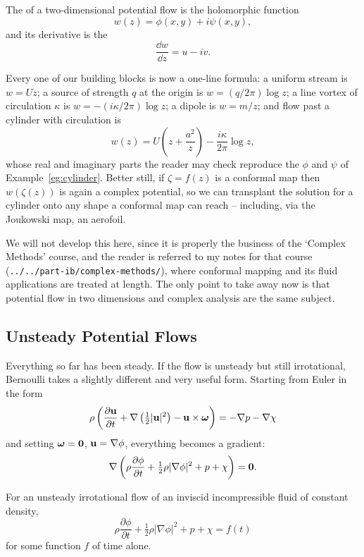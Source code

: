 \documentclass[a4paper]{scrartcl}
\newcommand{\pd}[2]{\frac{\partial #1}{\partial #2}}
\newcommand{\bom}{\boldsymbol{\omega}}
\begin{document}
\begin{definition}
	The  of a two-dimensional potential flow is the holomorphic function
	$$
	w(z) = \phi(x,y) + i \psi(x, y),
	$$
	and its derivative is the 
	$$
	\frac{\dd w}{\dd z} = u - iv.
	$$
\end{definition}

Every one of our building blocks is now a one-line formula: a uniform stream is $w = Uz$; a source of strength $q$ at the origin is $w = (q/2\pi)\log z$; a line vortex of circulation $\kappa$ is $w = -(i\kappa/2\pi)\log z$; a dipole is $w = m/z$; and flow past a cylinder with circulation is
$$
w(z) = U\left(z + \frac{a^2}{z}\right) - \frac{i\kappa}{2\pi}\log z,
$$
whose real and imaginary parts the reader may check reproduce the $\phi$ and $\psi$ of Example~\ref{eg:cylinder}. Better still, if $\zeta = f(z)$ is a conformal map then $w(\zeta(z))$ is again a complex potential, so we can transplant the solution for a cylinder onto any shape a conformal map can reach -- including, via the Joukowski map, an aerofoil.

We will not develop this here, since it is properly the business of the `Complex Methods' course, and the reader is referred to my notes for that course (\texttt{../../part-ib/complex-methods/}), where conformal mapping and its fluid applications are treated at length. The only point to take away now is that potential flow in two dimensions and complex analysis are the same subject.

\subsection{Unsteady Potential Flows}

Everything so far has been steady. If the flow is unsteady but still irrotational, Bernoulli takes a slightly different and very useful form. Starting from Euler in the form
$$
\rho\left(\pd{\vv u}{t} + \nabla\left(\tfrac{1}{2}|\vv u|^2\right) - \vv u \times \bom\right) = -\nabla p - \nabla\chi
$$
and setting $\bom = \vv 0$, $\mathbf{u} = \nabla\phi$, everything becomes a gradient:
$$
\nabla\left(\rho\pd{\phi}{t} + \tfrac{1}{2}\rho|\nabla\phi|^2 + p + \chi\right) = \vv 0.
$$

\begin{proposition}
	For an unsteady irrotational flow of an inviscid incompressible fluid of constant density,
	$$
	\rho \pd{\phi}{t} + \tfrac{1}{2}\rho|\nabla\phi|^2 + p + \chi = f(t)
	$$
	for some function $f$ of time alone.
\end{proposition}
\end{document}
